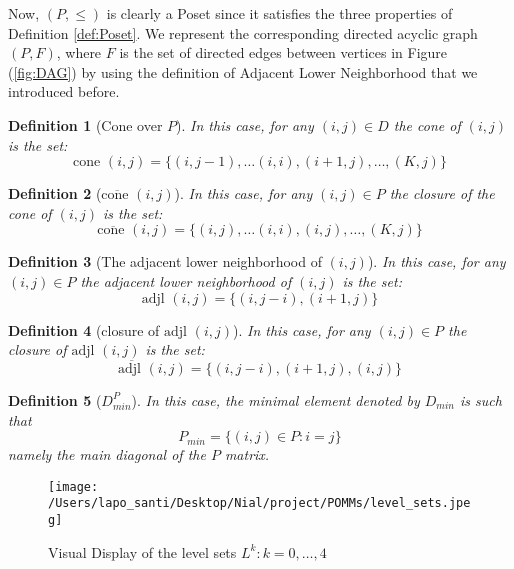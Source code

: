 \documentclass[11pt]{amsart}
\newtheorem{definition}{Definition}
\begin{document}
Now, $(P, \leq)$ is clearly a Poset since it satisfies the three properties of Definition \eqref{def:Poset}. We represent the corresponding directed acyclic graph $(P,F)$, where $F$ is the set of directed edges between vertices in Figure (\ref{fig:DAG}) by using the definition of Adjacent Lower Neighborhood that we introduced before.



\begin{definition}[Cone over $P$]In this case, for any $(i,j) \in D$ the cone of $(i,j)$ is the set:
\begin{equation}
\text{cone } (i,j)  = \{(i,j-1), \ldots (i,i), (i+1,j), \dots,(K,j) \}
\end{equation}
\end{definition}
\begin{definition}[$\overline{\text{cone }} (i,j)$]
In this case, for any $(i,j) \in P$ the closure of the cone of $(i,j)$ is the set:
\begin{equation}
\overline{\text{cone }} (i,j)  = \{(i,j), \ldots (i,i), (i,j), \dots,(K,j) \}
\end{equation}
\end{definition}

\begin{definition}[The adjacent lower neighborhood of $(i,j)$]
In this case, for any $(i,j) \in P$ the adjacent lower neighborhood of $(i,j)$ is the set:
\begin{equation}
\text{adjl } (i,j)  = \{(i,j-i), (i+1,j)\}
\end{equation}
\end{definition}

\begin{definition}[closure of $\text{adjl } (i,j)$]
In this case, for any $(i,j) \in P$ the closure of $\text{adjl } (i,j)$ is the set:
\begin{equation}
\overline{\text{adjl }} (i,j)  = \{(i,j-i), (i+1,j), (i,j)\}
\end{equation}
\end{definition}

\begin{definition}[$D_{min}^P$]
In this case, the \textit{minimal element} denoted by $D_{min}$ is such that
\begin{equation}
P_{min}  = \{(i,j) \in P: i=j\}
\end{equation}
namely the main diagonal of the $P$ matrix. 
\end{definition}
\begin{figure}
\begin{center}
\texttt{[image: /Users/lapo\_santi/Desktop/Nial/project/POMMs/level\_sets.jpeg]}
\caption{Visual Display of the level sets $L^k: k=0,\ldots,4$}
\label{fig:level_sets}
\end{center}
\end{figure}
\end{document}
